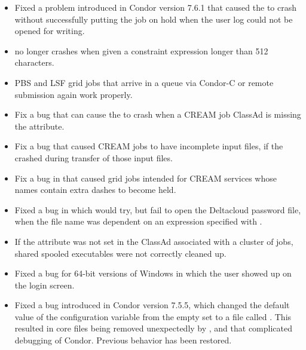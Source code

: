 \begin{itemize}
\item Fixed a problem introduced in Condor version 7.6.1 
that caused the  to crash without successfully putting the job 
on hold when the user log could not be opened for writing. 

\item {} no longer crashes when given a constraint expression 
longer than 512 characters. 

\item PBS and LSF grid jobs that arrive in a queue via Condor-C
or remote submission again work properly. 

\item Fix a bug that can cause the  to crash 
when a CREAM job ClassAd is missing the  attribute. 

\item Fix a bug that caused CREAM jobs to have incomplete input files,
if the  crashed during transfer of those input files. 

\item Fix a bug in  that caused grid jobs intended for 
CREAM services whose names contain extra dashes to become held. 

\item Fixed a bug in which  would try, 
but fail to open the Deltacloud password file,
when the file name was dependent on an expression specified with \Expr{\$\$()}.

\item If the  attribute was not set in the ClassAd associated
with a cluster of jobs,
shared spooled executables were not correctly cleaned up.

\item Fixed a bug for 64-bit versions of Windows in which the
user  showed up on the login screen.

\item Fixed a bug introduced in Condor version 7.5.5,
which changed the default value of the configuration variable
 from the empty set to a file called .
This resulted in core files being removed unexpectedly by ,
and that complicated debugging of Condor.
Previous behavior has been restored.


\end{itemize}
